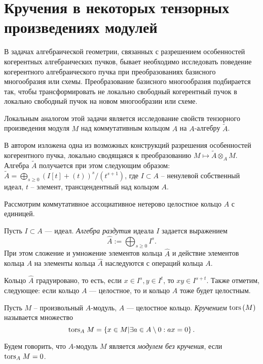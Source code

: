 \section{Кручения в некоторых тензорных произведениях модулей}
    В задачах алгебраической геометрии, связанных с разрешением особенностей когерентных 
    алгебраических пучков, бывает необходимо 
    исследовать поведение когерентного алгебраического пучка при преобразованиях базисного 
    многообразия или схемы.
    Преобразование базисного многообразия подбирается так, чтобы трансформировать не локально 
    свободный когерентный пучок в локально
    свободный пучок на новом многообразии или схеме. 

    Локальным аналогом этой задачи является исследование свойств тензорного произведения модуля $M$ 
    над коммутативным кольцом $A$ на $A$-алгебру $\widetilde{A}$.

    В \cite{Timofeeva} автором изложена одна из возможных конструкций разрешения особенностей когерентного пучка, 
    локально сводящаяся к преобразованию $M \mapsto \widetilde{A} \otimes_A M$.
    Алгебра $\widetilde{A}$ получается при этом следующим образом: 
    $\widetilde{A} = \bigoplus_{s \geq 0} (I[t] + (t))^s / (t^{s + 1})$, где $I \subset A$ -- 
    ненулевой собственный
    идеал, $t$ -- элемент, трансцендентный над кольцом $A$.

    Рассмотрим коммутативное ассоциативное нетерово целостное кольцо $A$ с единицей. 
    
    \begin{Def}
        Пусть $I \subset A$ --- идеал. \textit{Алгебра раздутия} идеала $I$ задается выражением 
        $$\widehat{A} := \bigoplus_{s \geq 0} I^s.$$
        При этом сложение и умножение элементов кольца $\widehat{A}$ и действие элементов кольца $A$
        на элементы кольца $\widehat{A}$ наследуются с операций кольца $A$.
    \end{Def}
    Кольцо $\widehat{A}$ градуировано, то есть, если $x \in I^s, y \in I^t$, то $xy \in I^{s + t}$.
    Также отметим, следующее: если кольцо $A$ --- целостное, то и кольцо $\hat A$ тоже будет целостным.

    \begin{Def}
        Пусть $M$ -- произвольный $A$-модуль, $A$ --- целостное кольцо. 
        \textit{Кручением} $\textup{tors}\left(M\right)$ называется множество
        \begin{equation*}
            \textup{tors}_{A}\;M = \left\{x \in M | \exists a \in A\setminus 0 : ax = 0 \right\}.
        \end{equation*}
    \end{Def}
    \begin{Def}
        Будем говорить, что $A$-модуль $M$ является \textit{модулем без кручения}, если $\textup{tors}_{A}\;M = 0$.
    \end{Def}

